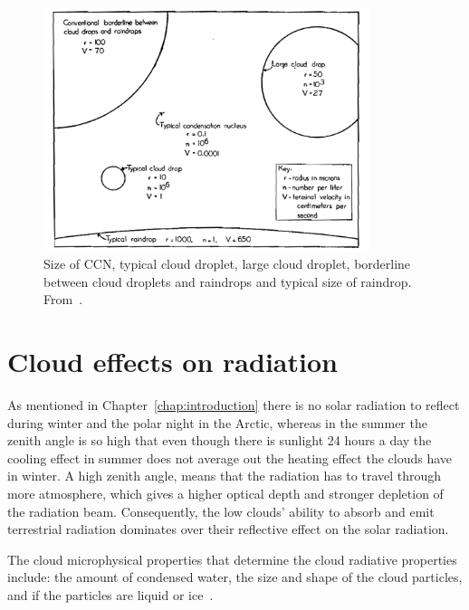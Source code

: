 \begin{figure}
\centering
\includegraphics[width=0.85\textwidth]{theory/dropletsize.png}
\caption{Size of CCN, typical cloud droplet, large cloud droplet, borderline between cloud droplets and raindrops and typical size of raindrop.%
 From~\citep{McDonald1958}.}
\label{fig:dropletsize}
\end{figure}

\section{Cloud effects on radiation}
As mentioned in Chapter~\ref{chap:introduction} there is no solar radiation to reflect during winter and the polar night in the Arctic, whereas in the summer the zenith angle is so high that even though there is sunlight 24 hours a day the cooling effect in summer does not average out the heating effect the clouds have in winter. A high zenith angle, means that the radiation has to travel through more atmosphere, which gives a higher optical depth and stronger depletion of the radiation beam. Consequently, the low clouds' ability to absorb and emit terrestrial radiation dominates over their reflective effect on the solar radiation.

The cloud microphysical properties that determine the cloud radiative properties include: the amount of condensed water, the size and shape of the cloud particles, and if the particles are liquid or ice~\citep{Curry1996}.

